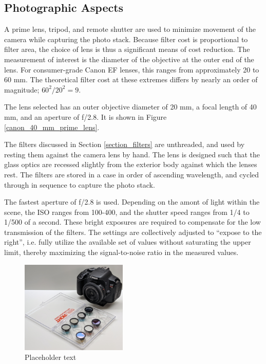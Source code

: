 \documentclass[twocolumn,10pt]{asme2ej}
\newcommand{\id}{\hspace{6 mm}}
\begin{document}
\subsection{Photographic Aspects}
\label{photographic}

 A prime lens, tripod, and remote shutter are used to minimize movement of the camera while capturing the photo stack. Because filter cost is proportional to filter area, the choice of lens is thus a significant means of cost reduction. The measurement of interest is the diameter of the objective at the outer end of the lens. For consumer-grade Canon EF lenses, this ranges from approximately 20 to 60 mm. The theoretical filter cost at these extremes differs by nearly an order of magnitude; $60^2 / 20^2 = 9$.

\id The lens selected has an outer objective diameter of 20 mm, a focal length of 40 mm, and an aperture of f/2.8. It is shown in Figure \ref{canon_40_mm_prime_lens}.

\id The filters discussed in Section \ref{section_filters} are unthreaded, and used by resting them against the camera lens by hand. The lens is designed such that the glass optics are recessed slightly from the exterior body against which the lenses rest. The filters are stored in a case in order of ascending wavelength, and cycled through in sequence to capture the photo stack.

\id The fastest aperture of f/2.8 is used. Depending on the amont of light within the scene, the ISO ranges from 100-400, and the shutter speed ranges from 1/4 to 1/500 of a second. These bright exposures are required to compensate for the low transmission of the filters. The settings are collectively adjusted to ``expose to the right'', i.e. fully utilize the available set of values without saturating the upper limit, thereby maximizing the signal-to-noise ratio in the measured values.

\begin{figure}
\centering
\includegraphics[width=0.45\textwidth]{IMG_20210712_212507_GIMP.jpg}
\caption{Placeholder text}
\label{canon}
\end{figure}
\end{document}
